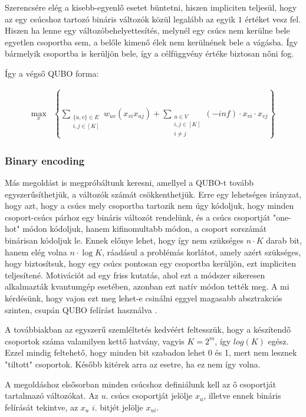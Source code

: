 Szerencsére elég a kisebb-egyenlő esetet büntetni, hiszen impliciten teljesül, hogy az egy csúcshoz tartozó bináris változók közül legalább az egyik $1$ értéket vesz fel. Hiszen ha lenne egy változóbehelyettesítés, melynél egy csúcs nem kerülne bele egyetlen csoportba sem, a belőle kimenő élek nem kerülnének bele a vágásba. Így bármelyik csoportba is kerüljön bele, így a célfüggvény értéke biztosan nőni fog.

Így a végső QUBO forma:

\begin{align} 
	\max_{x} & \left\{\sum _{\substack{\{u,v\} \in E \\ i,j \in [K]}} w_{uv}(x_{vi}  x_{uj}) + \sum _{\substack{u \in V \\ i,j \in [K] \\  i \neq j}} (-inf) \cdot x_{vi} \cdot x_{vj}\right\} 
\end{align}



\subsubsection{Binary encoding}

Más megoldást is megpróbáltunk keresni, amellyel a QUBO-t tovább egyszerűsíthetjük, a változók számát csökkenthetjük. Erre egy lehetséges irányzat, hogy azt, hogy a csúcs mely csoportba tartozik nem úgy kódoljuk, hogy minden csoport-csúcs párhoz egy bináris változót rendelünk, és a csúcs csoportját "one-hot" módon kódoljuk, hanem kifinomultabb módon, a csoport sorszámát binárisan kódoljuk le. Ennek előnye lehet, hogy így nem szükséges $n \cdot K$ darab bit, hanem elég volna $n \cdot \log K$, ráadásul a problémás korlátot, amely azért szükséges, hogy biztosítsuk, hogy egy csúcs pontosan egy csoportba kerüljön, ezt impliciten teljesítené. Motivációt ad egy friss kutatás, ahol ezt a módszer sikeresen alkalmazták kvantumgép esetében, azonban ezt natív módon tették meg. A mi kérdésünk, hogy vajon ezt meg lehet-e csinálni eggyel magasabb absztrakciós szinten, csupán QUBO felírást használva \cite{fuchs2020efficient}.

A továbbiakban az egyszerű szemléltetés kedvéért feltesszük, hogy a készítendő csoportok száma valamilyen kettő hatvány, vagyis $K=2^m$, így $log(K)$ egész. Ezzel mindig feltehető, hogy minden bit szabadon lehet 0 és 1, mert nem lesznek "tiltott" csoportok. Később kitérek arra az esetre, ha ez nem így volna.

A megoldáshoz elsősorban minden csúcshoz definiálunk kell az ő csoportját tartalmazó változókat. Az $u.$ csúcs csoportját jelölje $x_u$, illetve ennek bináris felírását tekintve, az $x_u$ $i.$ bitjét jelölje $x_{ui}$.

